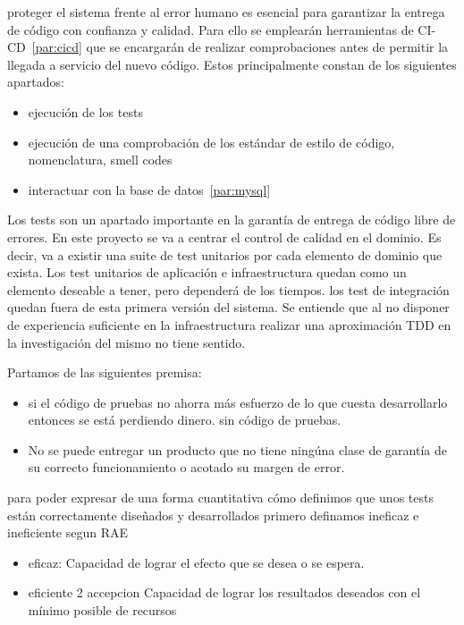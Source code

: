 proteger el sistema frente al error humano es esencial para garantizar la entrega de código con confianza y calidad. Para ello se emplearán herramientas de CI-CD~\ref{par:cicd} que se encargarán de realizar comprobaciones antes de permitir la llegada a servicio del nuevo código. Estos principalmente constan de los siguientes apartados:

\begin{itemize}
    \item ejecución de los tests
    \item ejecución de una comprobación de los estándar de estilo de código, nomenclatura, smell codes
    \item interactuar con la base de datos~\ref{par:mysql}
\end{itemize}

Los tests son un apartado importante en la garantía de entrega de código libre de errores. En este proyecto se va a centrar el control de calidad en el dominio. Es decir, va a existir una suite de test unitarios por cada elemento de dominio que exista. Los test unitarios de aplicación e infraestructura quedan como un elemento deseable a tener, pero dependerá de los tiempos. los test de integración quedan fuera de esta primera versión del sistema. Se entiende que al no disponer de experiencia suficiente en la infraestructura realizar una aproximación TDD en la investigación del mismo no tiene sentido.

Partamos de las siguientes premisa:

\begin{itemize}
    \item si el código de pruebas no ahorra más esfuerzo de lo que cuesta desarrollarlo entonces se está perdiendo dinero.
    sin código de pruebas.
    \item No se puede entregar un producto que no tiene ningúna clase de garantía de su correcto funcionamiento o acotado su margen de error.
\end{itemize}

para poder expresar de una forma cuantitativa cómo definimos que unos tests están correctamente diseñados y desarrollados primero
definamos ineficaz e ineficiente segun RAE

\begin{itemize}
    \item eficaz: Capacidad de lograr el efecto que se desea o se espera.
    \item eficiente 2 accepcion Capacidad de lograr los resultados deseados con el mínimo posible de recursos
\end{itemize}

